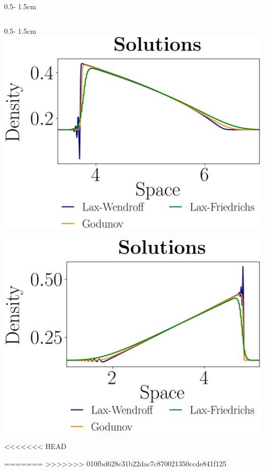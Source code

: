 \documentclass{uibposter}
\begin{document}
\begin{frame}[fragile]
\begin{columns}
\begin{column}{0.5\textwidth - 1.5cm}
\begin{column}{0.5\textwidth - 1.5cm}
    \includegraphics{fig/traffic_compare.png}
    
    \includegraphics{fig/burger_compare.png}
    
<<<<<<< HEAD

   

=======
>>>>>>> 010fbd628c31b22dac7c870021350ccde841f125
\end{column}
\end{column}
\end{columns}





\end{frame}
\end{document}
